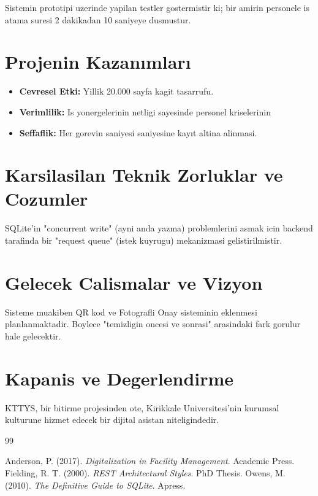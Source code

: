 \documentclass[12pt,a4paper,oneside]{report}
\begin{document}
Sistemin prototipi uzerinde yapilan testler gostermistir ki; bir amirin personele is atama suresi 2 dakikadan 10 saniyeye dusmustur.

\section{Projenin Kazanımları}

\begin{itemize}
    \item \textbf{Cevresel Etki:} Yillik 20.000 sayfa kagit tasarrufu.
    \item \textbf{Verimlilik:} Is yonergelerinin netligi sayesinde personel kriselerinin %
    \item \textbf{Seffaflik:} Her gorevin saniyesi saniyesine kayıt altina alinmasi.
\end{itemize}

\section{Karsilasilan Teknik Zorluklar ve Cozumler}

SQLite'in "concurrent write" (ayni anda yazma) problemlerini asmak icin backend tarafinda bir "request queue" (istek kuyrugu) mekanizmasi gelistirilmistir.

\section{Gelecek Calismalar ve Vizyon}

Sisteme muakiben QR kod ve Fotografli Onay sisteminin eklenmesi planlanmaktadir. Boylece "temizligin oncesi ve sonrasi" arasindaki fark gorulur hale gelecektir.

\section{Kapanis ve Degerlendirme}

KTTYS, bir bitirme projesinden ote, Kirikkale Universitesi'nin kurumsal kulturune hizmet edecek bir dijital asistan niteligindedir.

\begin{thebibliography}{99}

 Anderson, P. (2017). \textit{Digitalization in Facility Management}. Academic Press.
 Fielding, R. T. (2000). \textit{REST Architectural Styles}. PhD Thesis.
 Owens, M. (2010). \textit{The Definitive Guide to SQLite}. Apress.
\end{thebibliography}
\end{document}
